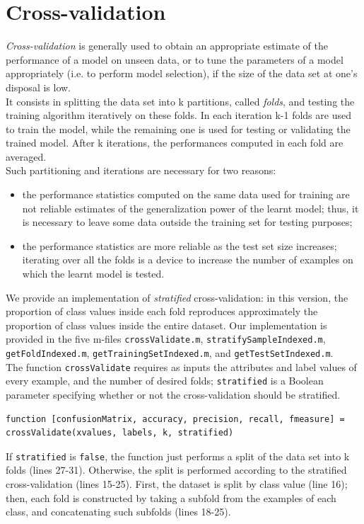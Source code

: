 \documentclass{article}
\begin{document}
\section{Cross-validation}
\emph{Cross-validation} is generally used to obtain an appropriate estimate of the performance of a model on unseen data, or to tune the parameters of a model appropriately (i.e. to perform model selection), if the size of the data set at one's disposal is low.\\
It consists in splitting the data set into k partitions, called \emph{folds}, and testing the training algorithm iteratively on these folds. In each iteration k-1 folds are used to train the model, while the remaining one is used for testing or validating the trained model. After k iterations, the performances computed in each fold are averaged.\\
Such partitioning and iterations are necessary for two reasons:
\begin{itemize}
	\item the performance statistics computed on the same data used for training are not reliable estimates of the generalization power of the learnt model; thus, it is necessary to leave some data outside the training set for testing purposes;
	\item the performance statistics are more reliable as the test set size increases; iterating over all the folds is a device to increase the number of examples on which the learnt model is tested.
\end{itemize}
We provide an implementation of \emph{stratified} cross-validation: in this version, the proportion of class values inside each fold reproduces approximately the proportion of class values inside the entire dataset. Our implementation is provided in the five m-files \verb$crossValidate.m$, \verb$stratifySampleIndexed.m$, \verb$getFoldIndexed.m$, \verb$getTrainingSetIndexed.m$, and \verb$getTestSetIndexed.m$.\\
The function \verb$crossValidate$ requires as inputs the attributes and label values of every example, and the number of desired folds; \verb$stratified$ is a Boolean parameter specifying whether or not the cross-validation should be stratified.
\begin{lstlisting}[breaklines=true]
function [confusionMatrix, accuracy, precision, recall, fmeasure] = crossValidate(xvalues, labels, k, stratified)
\end{lstlisting}
If \verb$stratified$ is \verb$false$, the function just performs a split of the data set into k folds (lines 27-31). Otherwise, the split is performed according to the stratified cross-validation (lines 15-25). First, the dataset is split by class value (line 16); then, each fold is constructed by taking a subfold from the examples of each class, and concatenating such subfolds (lines 18-25).
\end{document}
